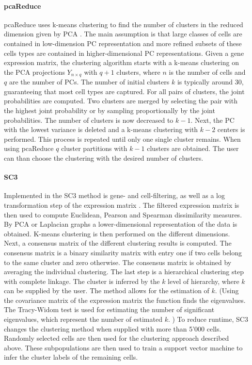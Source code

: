 \documentclass[12pt, a4paper]{article}\usepackage[]{graphicx}\usepackage[]{color}
\begin{document}
\paragraph{pcaReduce}
pcaReduce uses k-means clustering to find the number of clusters in the reduced dimension given by PCA \citep{yau2016pcareduce}. The main assumption is that large classes of cells are contained in low-dimension PC representation and more refined subsets of these cells types are contained in higher-dimensional PC representations. Given a gene expression matrix, the clustering algorithm starts with a k-means clustering on the PCA projections $Y_{n\times q}$ with $q+1$ clusters, where $n$ is the number of cells and $q$ are the number of PCs. The number of initial clusters $k$ is typically around 30,  guaranteeing that most cell types are captured. For all pairs of clusters, the joint probabilities are computed. Two clusters are merged by selecting the pair with the highest joint probability or by sampling proportionally by the joint probabilities. The number of clusters is now decreased to $k-1$. Next, the PC with the lowest variance is deleted and a k-means clustering with $k-2$ centers is performed. This process is repeated until only one single cluster remains. When using pcaReduce $q$ cluster partitions with $k-1$ clusters are obtained. The user can than choose the clustering with the desired number of clusters.
\paragraph{SC3}
Implemented in the SC3 method is gene- and cell-filtering, as well as a log transformation step of the expression matrix \citep{kiselev2017sc3}. The filtered expression matrix is then used to compute  Euclidean, Pearson and  Spearman dissimilarity measures. By PCA or Laplacian graphs a lower-dimensional representation of the data is obtained.  K-means clustering is then performed on the different dimensions. Next, a consensus matrix of the different clustering results is computed. The consensus matrix is a binary similarity matrix with entry one if two cells belong to the same cluster and zero otherwise. The consensus matrix is obtained by averaging the individual clustering. The last step is a hierarchical clustering step with complete linkage. The cluster is inferred by the $k$ level of hierarchy, where $k$ can be supplied by the user. The method allows for the estimation of $k$. (Using the covariance matrix of the expression matrix the function finds the eigenvalues. The Tracy-Widom test is used for estimating the number of significant eigenvalues, which represent the number of estimated $k$. )
To reduce runtime, SC3 changes the clustering method when supplied with more than 5'000 cells. Randomly selected cells are then used for the clustering approach described above. These subpopulations are then used to train a support vector machine to infer the cluster labels of the remaining cells.
\end{document}

